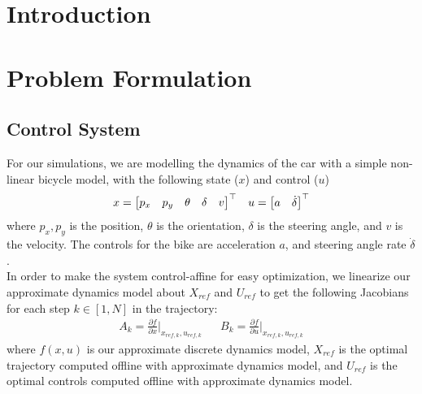 \documentclass[11pt]{article}
\begin{document}
    \headings
    
    \section{Introduction}
    
    \section{Problem Formulation} \label{sec:prob}
    \subsection{Control System} \label{sec:prob:control}
    For our simulations, we are modelling the dynamics of the car with a simple non-linear bicycle model, with the following state ($x$) and control ($u$)
    \begin{align*} 
        x = {\begin{bmatrix}p_x & p_y & \theta & \delta & v\end{bmatrix}}^{\top} &&
        u = {\begin{bmatrix}a & \dot{\delta}\end{bmatrix}}^{\top}
    \end{align*}
    where $p_x, p_y$ is the position, $\theta$ is the orientation, $\delta$ is the steering angle, and $v$ is the velocity. The controls for the bike are acceleration $a$, and steering angle rate $\dot{\delta}$. \\
    
    In order to make the system control-affine for easy optimization, we linearize our approximate dynamics model about $X_{ref}$ and $U_{ref}$ to get the following Jacobians for each step $k \in [1, N] $ in the trajectory:
    \begin{align*}
        A_k = \frac{\partial f}{\partial x}\bigg|_{x_{ref,k},u_{ref,k}} && 
        B_k = \frac{\partial f}{\partial u}\bigg|_{x_{ref,k},u_{ref,k}}
    \end{align*}
    where $f(x,u)$ is our approximate discrete dynamics model, $X_{ref}$ is the optimal trajectory computed offline with approximate dynamics model, and $U_{ref}$ is the optimal controls computed offline with approximate dynamics model. \\
    
\end{document}
